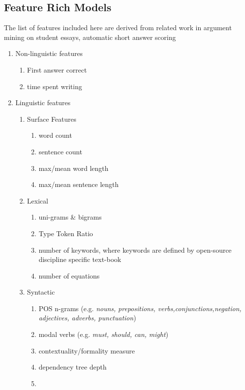 \documentclass[sigconf]{acmart}
\begin{document}
\subsection{Feature Rich Models}

The list of features included here are derived 
from related work in argument 
mining 
\cite{habernal_which_2016}\cite{persing_end--end_2016}
 on student 
essays, automatic short answer scoring 
\cite{mohler_text--text_2009}

\begin{enumerate}
	\item Non-linguistic features
	
	\begin{enumerate}
		\item First answer correct
		\item time spent writing
	\end{enumerate}
	
	
	
	\item Linguistic features
	
	\begin{enumerate}
		
		\item Surface Features
		\begin{enumerate}
			\item word count
			\item sentence count
			\item max/mean word length
			\item max/mean sentence length
		\end{enumerate}
		
		\item Lexical
		\begin{enumerate}
			\item uni-grams \& bigrams
			\item Type Token Ratio
			\item number of keywords, where 
			keywords are defined by open-source 
			discipline specific text-book
			\item number of equations
		\end{enumerate}
		
		\item Syntactic
		\begin{enumerate}
			\item POS n-grams (e.g. \textit{nouns, 
			prepositions, 
				verbs,conjunctions,negation, 
				adjectives, 
				adverbs, punctuation})
			\item modal verbs (e.g. \textit{must, 
			should, can, might})
			\item contextuality/formality measure 
			\cite{heylighen_variation_2002}
			\item dependency tree depth
			\item 
		\end{enumerate}
		

\end{enumerate}
\end{enumerate}
\end{document}
